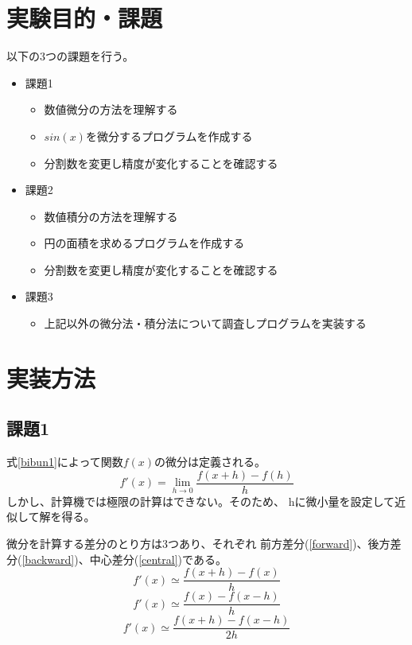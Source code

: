 \documentclass[dvipdfmx]{jsarticle}
\begin{document}
\section{実験目的・課題}
以下の3つの課題を行う。
\begin{itemize}
  \item 課題1
        \begin{itemize}
          \item 数値微分の方法を理解する
          \item $sin(x)$を微分するプログラムを作成する
          \item 分割数を変更し精度が変化することを確認する
        \end{itemize}
  \item 課題2
        \begin{itemize}
          \item 数値積分の方法を理解する
          \item 円の面積を求めるプログラムを作成する
          \item 分割数を変更し精度が変化することを確認する
        \end{itemize}
  \item 課題3
        \begin{itemize}
          \item 上記以外の微分法・積分法について調査しプログラムを実装する
        \end{itemize}
\end{itemize}

\section{実装方法}

\subsection{課題1}

式\ref{bibun1}によって関数$f(x)$の微分は定義される。
\begin{equation}
  f'(x) = \lim_{h \to 0} \frac{f(x+h)-f(h)}{h}
  \label{bibun1}
\end{equation}
しかし、計算機では極限の計算はできない。そのため、
hに微小量を設定して近似して解を得る。

微分を計算する差分のとり方は3つあり、それぞれ
前方差分(\ref{forward})、後方差分(\ref{backward})、中心差分(\ref{central})である。
\begin{equation}
  f'(x) \simeq \frac{f(x+h)-f(x)}{h}
  \label{forward}
\end{equation}
\begin{equation}
  f'(x) \simeq \frac{f(x)-f(x-h)}{h}
  \label{backward}
\end{equation}
\begin{equation}
  f'(x) \simeq \frac{f(x+h)-f(x-h)}{2h}
  \label{central}
\end{equation}
\end{document}
